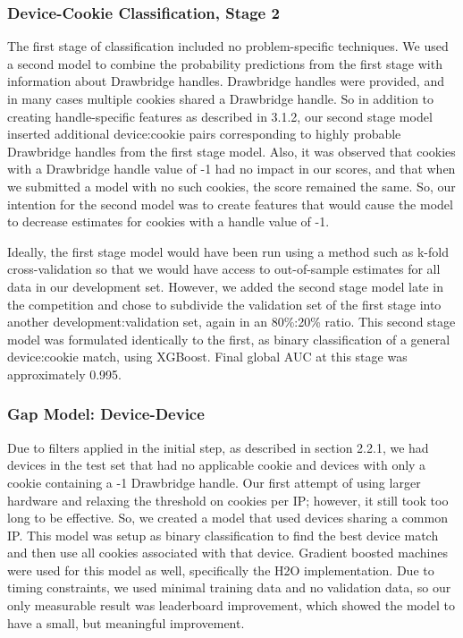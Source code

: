 \documentclass[9pt, journal]{IEEEtran}
\begin{document}
\subsubsection{Device-Cookie Classification, Stage 2}
The first stage of classification included no problem-specific techniques.
We used a second model to combine the probability predictions from the first stage with information about Drawbridge handles.
Drawbridge handles were provided, and in many cases multiple cookies shared a Drawbridge handle. 
So in addition to creating handle-specific features as described in 3.1.2, our second stage model inserted additional device:cookie pairs corresponding to highly probable Drawbridge handles from the first stage model. 
Also, it was observed that cookies with a Drawbridge handle value of -1 had no impact in our scores, and that when we submitted a model with no such cookies, the score remained the same.
So, our intention for the second model was to create features that would cause the model to decrease estimates for cookies with a handle value of -1.

Ideally, the first stage model would have been run using a method such as k-fold cross-validation so that we would have access to out-of-sample estimates for all data in our development set.
However, we added the second stage model late in the competition and chose to subdivide the validation set of the first stage into another development:validation set, again in an 80\%:20\% ratio.
This second stage model was formulated identically to the first, as binary classification of a general device:cookie match, using XGBoost. 
Final global AUC at this stage was approximately 0.995. 


\subsubsection{Gap Model: Device-Device}
Due to filters applied in the initial step, as described in section 2.2.1, we had devices in the test set that had no applicable cookie and devices with only a cookie containing a -1 Drawbridge handle.
Our first attempt of using larger hardware and relaxing the threshold on cookies per IP; however, it still took too long to be effective.
So, we created a model that used devices sharing a common IP. This model was setup as binary classification to find the best device match and then use all cookies associated with that device.
Gradient boosted machines were used for this model as well, specifically the H2O implementation. Due to timing constraints, we used minimal training data and no validation data, so our only measurable result was leaderboard improvement, which showed the model to have a small, but meaningful improvement.
\end{document}

